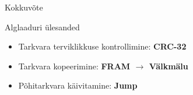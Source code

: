 \documentclass[pdf]{beamer}
\begin{document}
\begin{frame}{Kokkuvõte}
    \begin{block}{Alglaaduri ülesanded}
        \begin{itemize}
            \item Tarkvara terviklikkuse kontrollimine: \textbf{CRC-32}
            \item Tarkvara kopeerimine: \textbf{FRAM \(\to\) Välkmälu}
            \item Põhitarkvara käivitamine: \textbf{Jump}
        \end{itemize}
    \end{block}
\end{frame}
\end{document}
